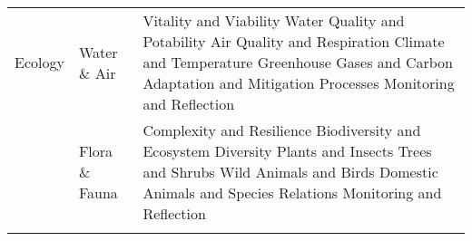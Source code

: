 \begin{table}[th]
\begin{center}
\begin{tabular}{ >{\raggedright\arraybackslash}p{} >{\raggedright\arraybackslash}p{} >{\raggedright\arraybackslash}p{} }
\hline
Ecology & Water \& Air & Vitality and Viability \linebreak Water Quality and Potability \linebreak Air Quality and Respiration \linebreak Climate and Temperature \linebreak Greenhouse Gases and Carbon \linebreak Adaptation and Mitigation Processes \linebreak Monitoring and Reflection \linebreak \\
  & Flora \& Fauna & Complexity and Resilience \linebreak Biodiversity and Ecosystem Diversity
Plants and Insects \linebreak Trees and Shrubs \linebreak Wild Animals and Birds \linebreak Domestic Animals and Species Relations \linebreak Monitoring and Reflection \\
\hline
\label{tbl:incomesByUfarmens1}
\end{tabular}
\end{center}
\end{table}

